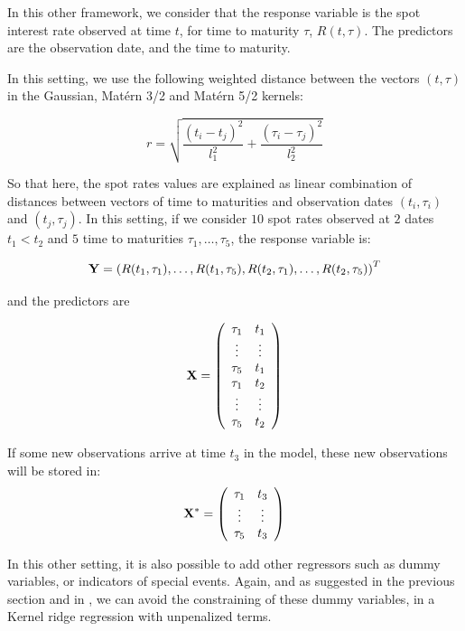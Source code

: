 In this other framework, we consider that the response variable is the spot interest rate observed at time $t$, for time to maturity $\tau$, $R(t, \tau)$. The predictors are the observation date, and the time to maturity. 

\medskip

In this setting, we use the following weighted distance between the vectors $(t, \tau)$ in the Gaussian, Mat\'ern 3/2 and Mat\'ern 5/2 kernels:

$$
r = \sqrt{\frac{(t_i - t_j)^2}{l_1^2} + \frac{(\tau_i - \tau_j)^2}{l_2^2}}
$$

So that here, the spot rates values are explained as linear combination of distances between vectors of  time to maturities and observation dates $(t_i, \tau_i)$ and $(t_j, \tau_j)$. In this setting, if we consider $10$ spot rates observed at $2$ dates $t_1 < t_2$ and $5$ time to maturities $\tau_1, \ldots, \tau_5$, the response variable is:

$$
{\bf Y} = \left(R(t_1, \tau_1), \ldots, R(t_1, \tau_5), R(t_2, \tau_1), \ldots, R(t_2, \tau_5)\right)^T
$$

and the predictors are 

$$
{\bf X} = \left( {\begin{array}{cc} \tau_1 &  t_1\\
                          \vdots & \vdots\\
                          \tau_5 &  t_1\\
                          \tau_1 &  t_2\\
                          \vdots & \vdots\\
                          \tau_5 &  t_2\\
       \end{array} } \right)
$$

If some new observations arrive at time $t_3$ in the model, these new observations will be stored in: 
$$
{\bf X}^* = \left( {\begin{array}{cc} \tau_1 &  t_3\\
                          \vdots & \vdots\\
                          \tau_5 &  t_3\\
       \end{array} } \right)
$$

In this other setting, it is also possible to add other regressors  such as dummy variables, or indicators of special events. Again, and as suggested in the previous section and in \cite{exterkate2016nonlinear}, we can avoid the constraining of these dummy variables, in a Kernel ridge regression with unpenalized terms. 

